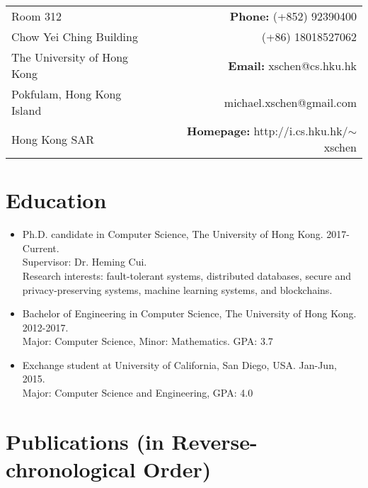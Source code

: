 \documentclass[a4paper,7pt]{article} %
\newcommand{\info}[1]{{\footnotesize \fontfamily{cmss}\selectfont #1}}
\begin{document}


\pagestyle{empty} %

\par{\bigskip\par} %

\begin{table}[!h]
\small
\begin{tabular}{p{13cm}r}
Room 312  & \textbf{Phone:} (+852) 92390400 \\
Chow Yei Ching Building & (+86) 18018527062\\
The University of Hong Kong       &  \textbf{Email:} xschen@cs.hku.hk    \\
Pokfulam, Hong Kong Island                         &   michael.xschen@gmail.com\\
Hong Kong SAR                     & \textbf{Homepage:} http://i.cs.hku.hk/$\sim$xschen
\end{tabular}
\end{table}
\section{Education}

\begin{itemize}

\item Ph.D. candidate in Computer Science, The University of Hong Kong. 2017-Current. \\
\info{Supervisor: Dr. Heming Cui.}\\
\info{Research interests: fault-tolerant systems, distributed databases, secure and privacy-preserving systems, machine learning systems, and blockchains.}

\item Bachelor of Engineering in Computer Science, The University of Hong Kong. 2012-2017. \\
\info{Major: Computer Science, Minor: Mathematics. GPA: 3.7}

\item Exchange student at University of California, San Diego, USA. Jan-Jun, 2015.  \\
\info{Major: Computer Science and Engineering, GPA: 4.0 }


\end{itemize}

\section{Publications (in Reverse-chronological Order)}
\end{document}
